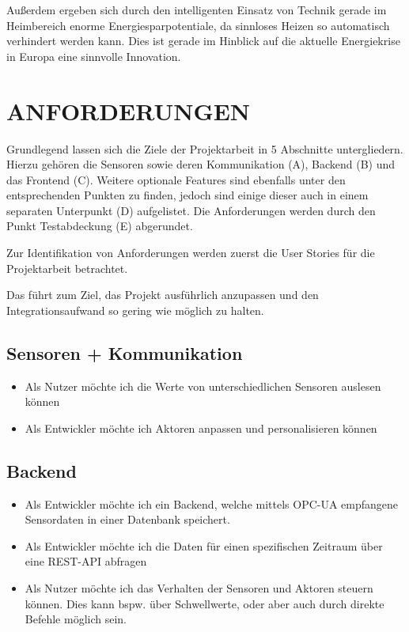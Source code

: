 \documentclass[letterpaper, 10 pt, conference]{ieeeconf}  %
\begin{document}
Außerdem ergeben sich durch den intelligenten Einsatz von Technik gerade im Heimbereich enorme Energiesparpotentiale, da sinnloses Heizen so automatisch verhindert werden kann. 
Dies ist gerade im Hinblick auf die aktuelle Energiekrise in Europa eine sinnvolle Innovation. 




\section{ANFORDERUNGEN}

Grundlegend lassen sich die Ziele der Projektarbeit in 5 Abschnitte untergliedern. Hierzu gehören die Sensoren sowie deren Kommunikation (A), Backend (B) und das Frontend (C). Weitere optionale Features sind ebenfalls unter den entsprechenden Punkten zu finden, jedoch sind einige dieser auch in einem separaten Unterpunkt (D) aufgelistet. Die Anforderungen werden durch den Punkt Testabdeckung (E) abgerundet.

Zur Identifikation von Anforderungen werden zuerst die User Stories für die Projektarbeit betrachtet.

Das führt zum Ziel, das Projekt ausführlich anzupassen und den Integrationsaufwand so gering wie möglich zu halten. 

\subsection{Sensoren + Kommunikation} 
\begin{itemize}
    \item Als Nutzer möchte ich die Werte von unterschiedlichen Sensoren auslesen können
    \item Als Entwickler möchte ich Aktoren anpassen und personalisieren können
\end{itemize}

\subsection{Backend}
\begin{itemize}
\item Als Entwickler möchte ich ein Backend, welche mittels OPC-UA empfangene Sensordaten in einer Datenbank speichert. 
\item Als Entwickler möchte ich die Daten für einen spezifischen Zeitraum über eine REST-API abfragen
\item Als Nutzer möchte ich das Verhalten der Sensoren und Aktoren steuern können. Dies kann bspw. über Schwellwerte, oder aber auch durch direkte Befehle möglich sein.
\end{itemize}
\end{document}
